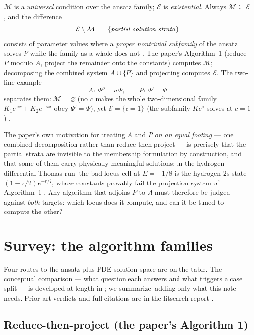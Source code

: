 \documentclass[11pt]{article}
\newcommand{\Psib}{\Psi}
\newcommand{\Mem}{\mathcal{M}}
\newcommand{\Ex}{\mathcal{E}}
\begin{document}
$\Mem$ is a \emph{universal} condition over the ansatz family; $\Ex$ is
\emph{existential}. Always $\Mem \subseteq \Ex$, and the difference
\[
  \Ex \setminus \Mem \;=\; \{\text{\emph{partial-solution strata}}\}
\]
consists of parameter values where a \emph{proper nontrivial subfamily} of the
ansatz solves $P$ while the family as a whole does not
\cite[Def.~1]{membership-note}. The paper's Algorithm~1 (reduce $P$ modulo
$A$, project the remainder onto the constants) computes $\Mem$; decomposing the
combined system $A \cup \{P\}$ and projecting computes $\Ex$. The two-line
example
\[
A:\ \Psib''-c\,\Psib, \qquad P:\ \Psib'-\Psib
\]
separates them: $\Mem = \varnothing$ (no $c$ makes the whole two-dimensional
family $K_1e^{\omega x}+K_2e^{-\omega x}$ obey $\Psib'=\Psib$), yet
$\Ex = \{c=1\}$ (the subfamily $Ke^{x}$ solves at $c=1$)
\cite[Ex.~1]{membership-note}.

The paper's own motivation for treating $A$ and $P$ \emph{on an equal
footing} --- one combined decomposition rather than reduce-then-project ---
is precisely that the partial strata are invisible to the membership
formulation by construction, and that some of them carry physically meaningful
solutions: in the hydrogen differential Thomas run, the bad-locus cell at
$E=-1/8$ is the hydrogen $2s$ state $(1-r/2)e^{-r/2}$, whose constants
provably fail the projection system of Algorithm~1
\cite{existence-route-report}. Any algorithm that adjoins $P$ to $A$ must
therefore be judged against \emph{both} targets: which locus does it compute,
and can it be tuned to compute the other?

\section{Survey: the algorithm families}
\label{sec:survey}

Four routes to the ansatz-plus-PDE solution space are on the table. The
conceptual comparison --- what question each answers and what triggers a case
split --- is developed at length in \cite{method-comparison}; we summarize,
adding only what this note needs. Prior-art verdicts and full citations are in
the litsearch report \cite{litsearch}.

\subsection{Reduce-then-project (the paper's Algorithm 1)}
\end{document}
